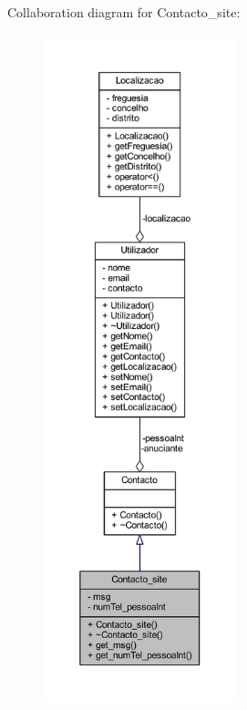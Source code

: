 Collaboration diagram for Contacto\+\_\+site\+:\nopagebreak
\begin{figure}[H]
\begin{center}
\leavevmode
\includegraphics[height=550pt]{class_contacto__site__coll__graph}
\end{center}
\end{figure}
